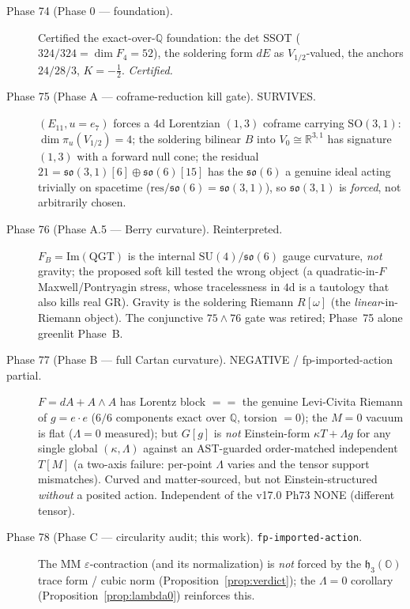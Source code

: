 \documentclass[11pt]{article}
\newcommand{\R}{\mathbb{R}}
\newcommand{\Q}{\mathbb{Q}}
\newcommand{\OO}{\mathbb{O}}
\newcommand{\eu}{e}
\newcommand{\om}{\omega}
\newcommand{\so}{\mathfrak{so}}
\newcommand{\hh}{\mathfrak{h}}
\theoremstyle{definition}\newtheorem{remark}{Remark}
\theoremstyle{definition}\newtheorem{definition}{Definition}
\theoremstyle{plain}\newtheorem{proposition}{Proposition}
\theoremstyle{plain}\newtheorem{lemma}{Lemma}
\begin{document}
\begin{description}
\item[Phase 74 (Phase 0 --- foundation).] Certified the exact-over-$\Q$ foundation: the
det SSOT ($324/324=\dim F_4=52$), the soldering form $dE$ as $V_{1/2}$-valued, the
anchors $24/28/3$, $K=-\tfrac12$. \emph{Certified.}
\item[Phase 75 (Phase A --- coframe-reduction kill gate). SURVIVES.] $(E_{11},u=e_7)$
forces a $4$d Lorentzian $(1,3)$ coframe carrying $\mathrm{SO}(3,1)$:
$\dim\pi_u(V_{1/2})=4$; the soldering bilinear $B$ into $V_0\cong\R^{3,1}$ has signature
$(1,3)$ with a forward null cone; the residual $21=\so(3,1)[6]\oplus\so(6)[15]$ has the
$\so(6)$ a genuine ideal acting trivially on spacetime ($\mathrm{res}/\so(6)=\so(3,1)$),
so $\so(3,1)$ is \emph{forced}, not arbitrarily chosen.
\item[Phase 76 (Phase A.5 --- Berry curvature). Reinterpreted.] $F_B=\mathrm{Im(QGT)}$ is
the internal $\mathrm{SU}(4)/\so(6)$ gauge curvature, \emph{not} gravity; the proposed
soft kill tested the wrong object (a quadratic-in-$F$ Maxwell/Pontryagin stress, whose
tracelessness in $4$d is a tautology that also kills real GR). Gravity is the soldering
Riemann $R[\om]$ (the \emph{linear}-in-Riemann object). The conjunctive $75\wedge76$ gate
was retired; Phase~75 alone greenlit Phase~B.
\item[Phase 77 (Phase B --- full Cartan curvature). NEGATIVE / fp-imported-action
partial.] $F=dA+A\wedge A$ has Lorentz block $==$ the genuine Levi-Civita Riemann of
$g=\eu\cdot\eu$ ($6/6$ components exact over $\Q$, torsion $=0$); the $M=0$ vacuum is
flat ($\Lambda=0$ measured); but $G[g]$ is \emph{not} Einstein-form $\kappa T+\Lambda g$
for any single global $(\kappa,\Lambda)$ against an AST-guarded order-matched independent
$T[M]$ (a two-axis failure: per-point $\Lambda$ varies and the tensor support
mismatches). Curved and matter-sourced, but not Einstein-structured \emph{without} a
posited action. Independent of the v17.0 Ph73 NONE (different tensor).
\item[Phase 78 (Phase C --- circularity audit; this work). \texttt{fp-imported-action}.]
The MM $\varepsilon$-contraction (and its normalization) is \emph{not} forced by the
$\hh_3(\OO)$ trace form / cubic norm (Proposition~\ref{prop:verdict}); the
$\Lambda=0$ corollary (Proposition~\ref{prop:lambda0}) reinforces this.
\end{description}
\end{document}
